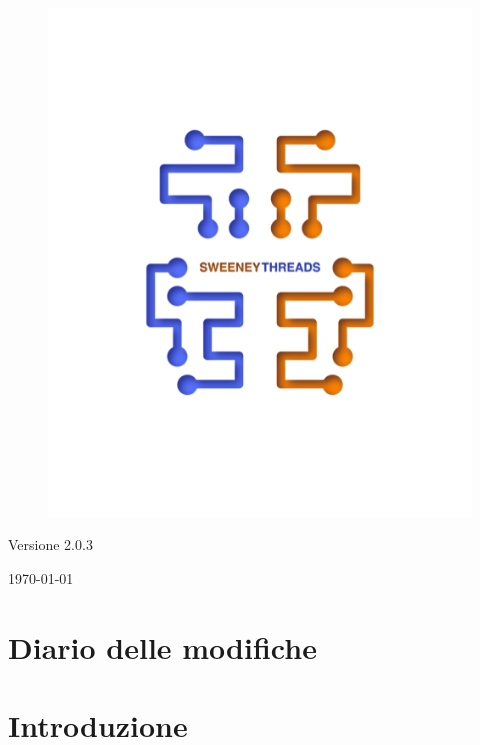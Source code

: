\documentclass[a4paper]{article}
\begin{document}
\begin{titlepage}
		\begin{figure}[H]
			\centering
			\includegraphics[scale=0.8]{sweeney.png}
		\end{figure}
		\begin{center}
			Versione 2.0.3
		\end{center}
		{\large \today}\\[3cm] 
		\vfill  
	\end{titlepage}
	
	
	\tableofcontents
	
	\newpage 
	\section*{Diario delle modifiche}

	\newpage 
    \section{Introduzione}
\end{document}
